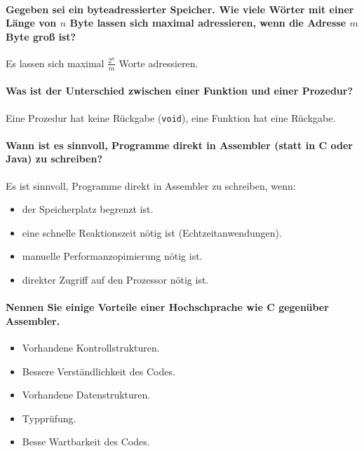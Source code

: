 \documentclass[a4paper, 11pt, accentcolor = tud3b]{tudreport}
\begin{document}
            \paragraph{Gegeben sei ein byteadressierter Speicher. Wie viele Wörter mit einer Länge von $ n $ Byte lassen sich maximal adressieren, wenn die Adresse $ m $ Byte groß ist?}
                Es lassen sich maximal $ \frac{2 ^ n}{m} $ Worte adressieren.

            \paragraph{Was ist der Unterschied zwischen einer Funktion und einer Prozedur?}
                Eine Prozedur hat keine Rückgabe (\texttt{void}), eine Funktion hat eine Rückgabe.

            \paragraph{Wann ist es sinnvoll, Programme direkt in Assembler (statt in C oder Java) zu schreiben?}
                Es ist sinnvoll, Programme direkt in Assembler zu schreiben, wenn:
                \begin{itemize}
                    \item der Speicherplatz begrenzt ist.
                    \item eine schnelle Reaktionszeit nötig ist (Echtzeitanwendungen).
                    \item manuelle Performanzopimierung nötig ist.
                    \item direkter Zugriff auf den Prozessor nötig ist.
                \end{itemize}

            \paragraph{Nennen Sie einige Vorteile einer Hochschprache wie C gegenüber Assembler.}
                \begin{itemize}
                    \item Vorhandene Kontrollstrukturen.
                    \item Bessere Verständlichkeit des Codes.
                    \item Vorhandene Datenstrukturen.
                    \item Typprüfung.
                    \item Besse Wartbarkeit des Codes.
                \end{itemize}
\end{document}
